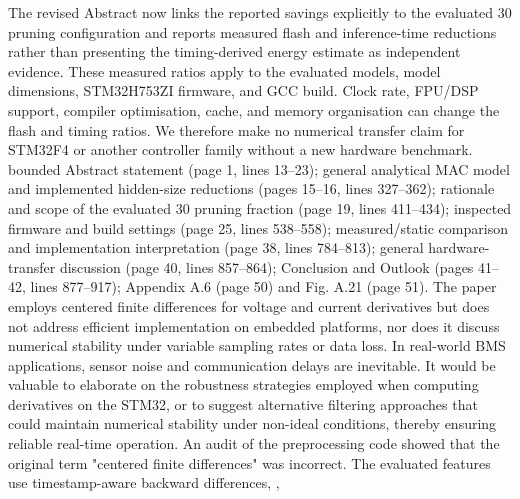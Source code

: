 {}The revised Abstract now links the reported savings explicitly to the evaluated 30\markdownRendererPercentSign{} pruning configuration and reports measured flash and inference-time reductions rather than presenting the timing-derived energy estimate as independent evidence. These measured ratios apply to the evaluated models, model dimensions, STM32H753ZI firmware, and GCC  build. Clock rate, FPU/DSP support, compiler optimisation, cache, and memory organisation can change the flash and timing ratios. We therefore make no numerical transfer claim for STM32F4 or another controller family without a new hardware benchmark.\markdownRendererParagraphSeparator
{} bounded Abstract statement (page 1, lines 13--23); general analytical MAC model and implemented hidden-size reductions (pages 15--16, lines 327--362); rationale and scope of the evaluated 30\markdownRendererPercentSign{} pruning fraction (page 19, lines 411--434); inspected firmware and build settings (page 25, lines 538--558); measured/static comparison and implementation interpretation (page 38, lines 784--813); general hardware-transfer discussion (page 40, lines 857--864); Conclusion and Outlook (pages 41--42, lines 877--917); Appendix A.6 (page 50) and Fig. A.21 (page 51).\markdownRendererInterblockSeparator
{}
\markdownRendererSectionEnd \markdownRendererSectionBegin
{}\markdownRendererInterblockSeparator
{}\markdownRendererBlockQuoteBegin
The paper employs centered finite differences for voltage and current derivatives but does not address efficient implementation on embedded platforms, nor does it discuss numerical stability under variable sampling rates or data loss. In real-world BMS applications, sensor noise and communication delays are inevitable. It would be valuable to elaborate on the robustness strategies employed when computing derivatives on the STM32, or to suggest alternative filtering approaches that could maintain numerical stability under non-ideal conditions, thereby ensuring reliable real-time operation.\markdownRendererBlockQuoteEnd \markdownRendererInterblockSeparator
{} An audit of the preprocessing code showed that the original term "centered finite differences" was incorrect. The evaluated features use timestamp-aware backward differences,\markdownRendererParagraphSeparator
{},\markdownRendererParagraphSeparator
